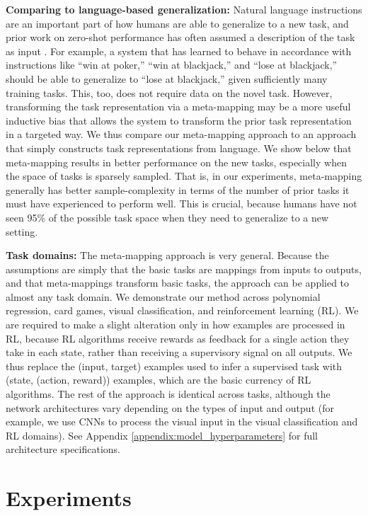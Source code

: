 \textbf{Comparing to language-based generalization:} Natural language instructions are an important part of how humans are able to generalize to a new task, and prior work on zero-shot performance has often assumed a description of the task as input \citep[e.g.]{Larochelle2008}. For example, a system that has learned to behave in accordance with instructions like ``win at poker,'' ``win at blackjack,'' and ``lose at blackjack,'' should be able to generalize to ``lose at blackjack,'' given sufficiently many training tasks. This, too, does not require data on the novel task. However, transforming the task representation via a meta-mapping may be a more useful inductive bias that allows the system to transform the prior task representation in a targeted way. We thus compare our meta-mapping approach to an approach that simply constructs task representations from language. We show below that meta-mapping results in better performance on the new tasks, especially when the space of tasks is sparsely sampled. That is, in our experiments, meta-mapping generally has better sample-complexity in terms of the number of prior tasks it must have experienced to perform well. This is crucial, because humans have not seen 95\% of the possible task space when they need to generalize to a new setting.

\textbf{Task domains:} The meta-mapping approach is very general. Because the assumptions are simply that the basic tasks are mappings from inputs to outputs, and that meta-mappings transform basic tasks, the approach can be applied to almost any task domain. We demonstrate our method across polynomial regression, card games, visual classification, and reinforcement learning (RL). We are required to make a slight alteration only in how examples are processed in RL, because RL algorithms receive rewards as feedback for a single action they take in each state, rather than receiving a supervisory signal on all outputs. We thus replace the (input, target) examples used to infer a supervised task with (state, (action, reward)) examples, which are the basic currency of RL algorithms. The rest of the approach is identical across tasks, although the network architectures vary depending on the types of input and output (for example, we use CNNs to process the visual input in the visual classification and RL domains). See Appendix \ref{appendix:model_hyperparameters} for full architecture specifications. 

\section{Experiments}

